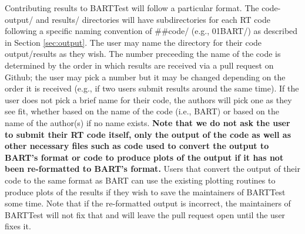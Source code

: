\documentclass[letterpaper, 12pt]{article}
\begin{document}
Contributing results to BARTTest will follow a particular format. The 
code-output/ and results/ directories will have subdirectories for each RT 
code following a specific naming convention of {\#}{\#}code/ (e.g., 01BART/) as 
described in Section \ref{sec:output}. The user may name the directory for 
their code output/results as they wish. The number 
preceeding the name of the code is determined by the order 
in which results are received via a pull request on Github; the user may pick 
a number but it may be changed depending on the order it is received (e.g., if 
two users submit results around the same time). If the user does not pick 
a brief name for their code, the authors will pick one as they see fit, 
whether based on the name of the code (i.e., BART) or based on the name of 
the author(s) if no name exists. \textbf{Note that we do not ask the user 
to submit their RT code itself, only the output of the code as well as other 
necessary files such as code used to convert the output to BART's format or 
code to produce plots of the output if it has not been re-formatted to 
BART's format.} Users that convert the output of their code to the same format 
as BART can use the existing plotting routines to produce plots of the 
results if they wish to save the maintainers of BARTTest some time. Note that 
if the re-formatted output is incorrect, the maintainers of BARTTest will not 
fix that and will leave the pull request open until the user fixes it.
\end{document}
